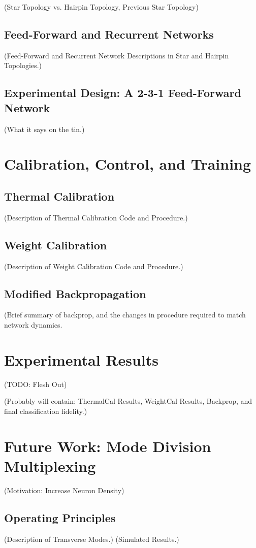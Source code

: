 \documentclass[12pt]{article}
\begin{document}
(Star Topology vs. Hairpin Topology, Previous Star Topology)

\subsection{Feed-Forward and Recurrent Networks}
(Feed-Forward and Recurrent Network Descriptions in Star and Hairpin Topologies.)

\subsection{Experimental Design: A 2-3-1 Feed-Forward Network}
(What it says on the tin.)

\section{Calibration, Control, and Training}
\subsection{Thermal Calibration}
(Description of Thermal Calibration Code and Procedure.)

\subsection{Weight Calibration}
(Description of Weight Calibration Code and Procedure.)

\subsection{Modified Backpropagation}
(Brief summary of backprop, and the changes in procedure required to match network dynamics.

\section{Experimental Results}
(TODO: Flesh Out)

(Probably will contain: ThermalCal Results, WeightCal Results, Backprop, and final classification fidelity.)

\section{Future Work: Mode Division Multiplexing}
(Motivation: Increase Neuron Density)
\subsection{Operating Principles}
(Description of Transverse Modes.)
(Simulated Results.)
\end{document}
